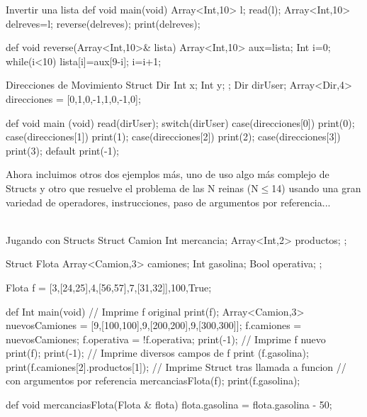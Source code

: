 \documentclass[12pt,onecolumn]{article}
\begin{document}
		\begin{wgetlisting}{Invertir una lista}
def void main(void){
	Array<Int,10> l;
	read(l);
	Array<Int,10> delreves=l;
	reverse(delreves);
	print(delreves);
}

def void reverse(Array<Int,10>& lista){
	Array<Int,10> aux=lista;
	Int i=0;
	while(i<10){
		lista[i]=aux[9-i];
		i=i+1;
	}
}
		\end{wgetlisting}
		
		\vspace{\baselineskip}
		\vspace{\baselineskip}
		
		\begin{wgetlisting}{Direcciones de Movimiento}
Struct Dir {
	Int x;
	Int y;
};
Dir dirUser;
Array<Dir,4> direcciones = [{0,1},{0,-1},{1,0},{-1,0}];

def void main (void) {
	read(dirUser);
	switch(dirUser) {
		case(direcciones[0]) {
			print(0);
		}
		case(direcciones[1]) {
			print(1);
		}
		case(direcciones[2]) {
			print(2);
		}
		case(direcciones[3]) {
			print(3);
		}
		default {
			print(-1);
		}
	}
}
		\end{wgetlisting}
		
		\vspace{\baselineskip}
		\vspace{\baselineskip}
		
		\newpage
		
		Ahora incluimos otros dos ejemplos más, uno de uso algo más complejo de Structs y otro que resuelve el problema de las N reinas (N$\leq$14) usando una gran variedad de operadores, instrucciones, paso de argumentos por referencia... \\ \\
		
		\begin{wgetlisting}{Jugando con Structs}
Struct Camion {
	Int mercancia;
	Array<Int,2> productos;
};

Struct Flota {
	Array<Camion,3> camiones;
	Int gasolina;
	Bool operativa;
};

Flota f = {[{3,[24,25]},{4,[56,57]},{7,[31,32]}],100,True};

def Int main(void) {
	// Imprime f original
	print(f);
	Array<Camion,3> nuevosCamiones = [{9,[100,100]},{9,[200,200]},{9,[300,300]}];
	f.camiones = nuevosCamiones;
	f.operativa = !f.operativa;
	print(-1);
	// Imprime f nuevo
	print(f);
	print(-1);
	// Imprime diversos campos de f
	print (f.gasolina);
	print(f.camiones[2].productos[1]);
	// Imprime Struct tras llamada a funcion
	// con argumentos por referencia
	mercanciasFlota(f);
	print(f.gasolina);
}

def void mercanciasFlota(Flota & flota) {
	flota.gasolina = flota.gasolina - 50;
}
		\end{wgetlisting}
		
\end{document}
